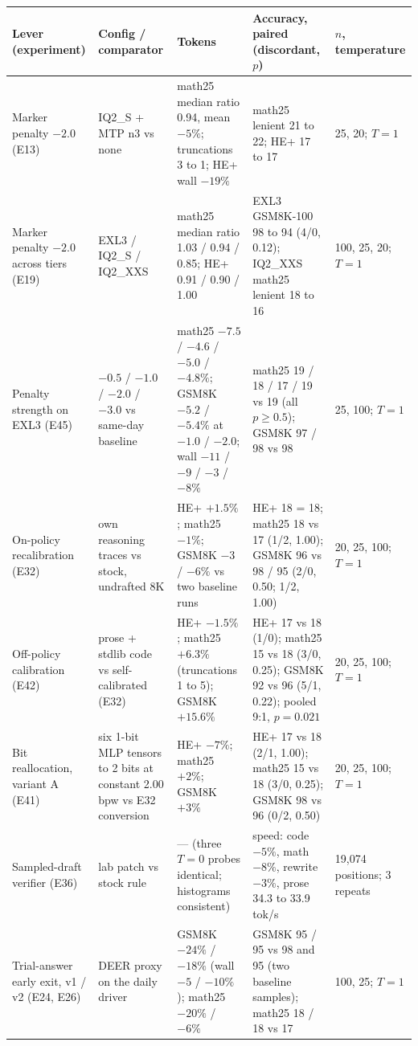 \documentclass[11pt]{article}
\begin{document}
\begin{table}[htbp]
\centering
\scriptsize
\setlength{\tabcolsep}{3pt}
\begin{tabular}{L{3.3cm}L{2.6cm}L{3.1cm}L{4.4cm}L{2.0cm}}
\toprule
Lever (experiment) & Config / comparator & Tokens & Accuracy, paired (discordant, $p$) & $n$, temperature \\
\midrule
Marker penalty $-2.0$ (E13) & IQ2\_S + MTP n3 vs none & math25 median ratio 0.94, mean $-5\%$; truncations 3 to 1; HE+ wall $-19\%$ & math25 lenient 21 to 22; HE+ 17 to 17 & 25, 20; $T{=}1$ \\
Marker penalty $-2.0$ across tiers (E19) & EXL3 / IQ2\_S / IQ2\_XXS & math25 median ratio 1.03 / 0.94 / 0.85; HE+ 0.91 / 0.90 / 1.00 & EXL3 GSM8K-100 98 to 94 (4/0, 0.12); IQ2\_XXS math25 lenient 18 to 16 & 100, 25, 20; $T{=}1$ \\
Penalty strength on EXL3 (E45) & $-0.5$ / $-1.0$ / $-2.0$ / $-3.0$ vs same-day baseline & math25 $-7.5$ / $-4.6$ / $-5.0$ / $-4.8\%$; GSM8K $-5.2$ / $-5.4\%$ at $-1.0$ / $-2.0$; wall $-11$ / $-9$ / $-3$ / $-8\%$ & math25 19 / 18 / 17 / 19 vs 19 (all $p\ge0.5$); GSM8K 97 / 98 vs 98 & 25, 100; $T{=}1$ \\
On-policy recalibration (E32) & own reasoning traces vs stock, undrafted 8K & HE+ $+1.5\%$; math25 $-1\%$; GSM8K $-3$ / $-6\%$ vs two baseline runs & HE+ 18 = 18; math25 18 vs 17 (1/2, 1.00); GSM8K 96 vs 98 / 95 (2/0, 0.50; 1/2, 1.00) & 20, 25, 100; $T{=}1$ \\
Off-policy calibration (E42) & prose + stdlib code vs self-calibrated (E32) & HE+ $-1.5\%$; math25 $+6.3\%$ (truncations 1 to 5); GSM8K $+15.6\%$ & HE+ 17 vs 18 (1/0); math25 15 vs 18 (3/0, 0.25); GSM8K 92 vs 96 (5/1, 0.22); pooled 9:1, $p=0.021$ & 20, 25, 100; $T{=}1$ \\
Bit reallocation, variant A (E41) & six 1-bit MLP tensors to 2 bits at constant 2.00 bpw vs E32 conversion & HE+ $-7\%$; math25 $+2\%$; GSM8K $+3\%$ & HE+ 17 vs 18 (2/1, 1.00); math25 15 vs 18 (3/0, 0.25); GSM8K 98 vs 96 (0/2, 0.50) & 20, 25, 100; $T{=}1$ \\
Sampled-draft verifier (E36) & lab patch vs stock rule & --- (three $T{=}0$ probes identical; histograms consistent) & speed: code $-5\%$, math $-8\%$, rewrite $-3\%$, prose 34.3 to 33.9 tok/s & 19,074 positions; 3 repeats \\
Trial-answer early exit, v1 / v2 (E24, E26) & DEER proxy on the daily driver & GSM8K $-24\%$ / $-18\%$ (wall $-5$ / $-10\%$); math25 $-20\%$ / $-6\%$ & GSM8K 95 / 95 vs 98 and 95 (two baseline samples); math25 18 / 18 vs 17 & 100, 25; $T{=}1$ \\

\end{tabular}
\end{table}
\end{document}
